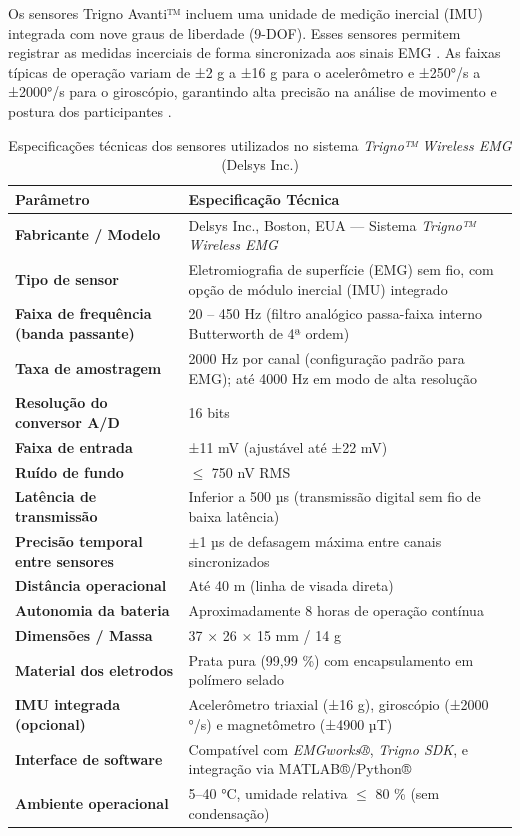 \documentclass[symbols]{fei}
\begin{document}
Os sensores Trigno Avanti™ incluem uma unidade de medição inercial (IMU) integrada com nove graus de liberdade (9-DOF). 
Esses sensores permitem registrar as medidas incerciais de forma sincronizada aos sinais EMG \cite{delsys_trigno_manual}. 
As faixas típicas de operação variam de ±2 g a ±16 g para o acelerômetro e ±250°/s a ±2000°/s para o giroscópio, garantindo alta 
precisão na análise de movimento e postura dos participantes \cite{delsys_trigno_manual}.

\begin{table}[H]
\centering
\caption{Especificações técnicas dos sensores utilizados no sistema \textit{Trigno™ Wireless EMG} (Delsys Inc.)}
\label{tab:trigno_specs}
\begin{tabular}{|p{5cm}|p{9cm}|}
\hline
\textbf{Parâmetro} & \textbf{Especificação Técnica} \\ \hline
\textbf{Fabricante / Modelo} & Delsys Inc., Boston, EUA — Sistema \textit{Trigno™ Wireless EMG} \\ \hline
\textbf{Tipo de sensor} & Eletromiografia de superfície (EMG) sem fio, com opção de módulo inercial (IMU) integrado \\ \hline
\textbf{Faixa de frequência (banda passante)} & 20 -- 450 Hz (filtro analógico passa-faixa interno Butterworth de 4ª ordem) \\ \hline
\textbf{Taxa de amostragem} & 2000 Hz por canal (configuração padrão para EMG); até 4000 Hz em modo de alta resolução \\ \hline
\textbf{Resolução do conversor A/D} & 16 bits \\ \hline
\textbf{Faixa de entrada} & ±11 mV (ajustável até ±22 mV) \\ \hline
\textbf{Ruído de fundo} & $\leq$ 750 nV RMS \\ \hline
\textbf{Latência de transmissão} & Inferior a 500 µs (transmissão digital sem fio de baixa latência) \\ \hline
\textbf{Precisão temporal entre sensores} & $\pm$1 µs de defasagem máxima entre canais sincronizados \\ \hline
\textbf{Distância operacional} & Até 40 m (linha de visada direta) \\ \hline
\textbf{Autonomia da bateria} & Aproximadamente 8 horas de operação contínua \\ \hline
\textbf{Dimensões / Massa} & 37 × 26 × 15 mm / 14 g \\ \hline
\textbf{Material dos eletrodos} & Prata pura (99,99 \%) com encapsulamento em polímero selado \\ \hline
\textbf{IMU integrada (opcional)} & Acelerômetro triaxial (±16 g), giroscópio (±2000 °/s) e magnetômetro (±4900 µT) \\ \hline
\textbf{Interface de software} & Compatível com \textit{EMGworks®}, \textit{Trigno SDK}, e integração via MATLAB®/Python® \\ \hline
\textbf{Ambiente operacional} & 5–40 °C, umidade relativa $\leq$ 80 \% (sem condensação) \\ \hline
\end{tabular}
\end{table}
\end{document}
